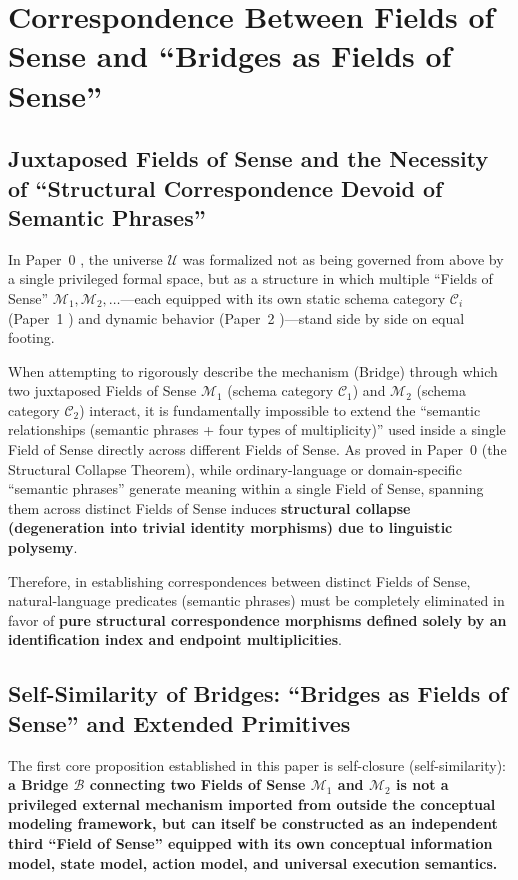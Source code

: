 \documentclass[11pt,a4paper]{article}
\theoremstyle{definition}
\theoremstyle{plain}
\theoremstyle{remark}
\begin{document}
\section{Correspondence Between Fields of Sense and ``Bridges as Fields of Sense''}

\subsection{Juxtaposed Fields of Sense and the Necessity of ``Structural Correspondence Devoid of Semantic Phrases''}
In Paper~0 \cite{ota2026paper0}, the universe $\mathcal{U}$ was formalized not as being governed from above by a single privileged formal space, but as a structure in which multiple ``Fields of Sense'' $\mathcal{M}_1, \mathcal{M}_2, \dots$---each equipped with its own static schema category $\mathcal{C}_i$ (Paper~1 \cite{ota2026paper1}) and dynamic behavior (Paper~2 \cite{ota2026paper2})---stand side by side on equal footing.

When attempting to rigorously describe the mechanism (Bridge) through which two juxtaposed Fields of Sense $\mathcal{M}_1$ (schema category $\mathcal{C}_1$) and $\mathcal{M}_2$ (schema category $\mathcal{C}_2$) interact, it is fundamentally impossible to extend the ``semantic relationships (semantic phrases + four types of multiplicity)'' used inside a single Field of Sense directly across different Fields of Sense. As proved in Paper~0 (the Structural Collapse Theorem), while ordinary-language or domain-specific ``semantic phrases'' generate meaning within a single Field of Sense, spanning them across distinct Fields of Sense induces \textbf{structural collapse (degeneration into trivial identity morphisms) due to linguistic polysemy}.

Therefore, in establishing correspondences between distinct Fields of Sense, natural-language predicates (semantic phrases) must be completely eliminated in favor of \textbf{pure structural correspondence morphisms defined solely by an identification index and endpoint multiplicities}.

\subsection{Self-Similarity of Bridges: ``Bridges as Fields of Sense'' and Extended Primitives}
The first core proposition established in this paper is self-closure (self-similarity): \textbf{a Bridge $\mathcal{B}$ connecting two Fields of Sense $\mathcal{M}_1$ and $\mathcal{M}_2$ is not a privileged external mechanism imported from outside the conceptual modeling framework, but can itself be constructed as an independent third ``Field of Sense'' equipped with its own conceptual information model, state model, action model, and universal execution semantics.}
\end{document}
